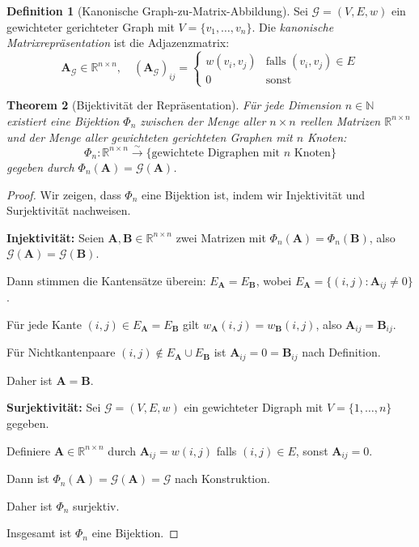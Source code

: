 \documentclass[12pt, a4paper]{article}
\newtheorem{theorem}{Theorem}[section]
\theoremstyle{definition}
\newtheorem{definition}[theorem]{Definition}
\theoremstyle{remark}
\newcommand{\R}{\mathbb{R}}
\newcommand{\N}{\mathbb{N}}
\newcommand{\vA}{\bm{A}}
\newcommand{\vB}{\bm{B}}
\newcommand{\Graph}{\mathcal{G}}
\begin{document}
\begin{definition}[Kanonische Graph-zu-Matrix-Abbildung]
\label{def:kanonische_graph_matrix}
Sei $\Graph = (V, E, w)$ ein gewichteter gerichteter Graph mit $V = \{v_1, \ldots, v_n\}$. Die \emph{kanonische Matrixrepräsentation} ist die Adjazenzmatrix:
\[
  \vA_{\Graph} \in \R^{n \times n}, \quad (\vA_{\Graph})_{ij} = \begin{cases}
    w(v_i, v_j) & \text{falls } (v_i, v_j) \in E \\
    0 & \text{sonst}
  \end{cases}
\]
\end{definition}

\begin{theorem}[Bijektivität der Repräsentation]
\label{thm:bijektivitaet}
Für jede Dimension $n \in \N$ existiert eine Bijektion $\Phi_n$ zwischen der Menge aller $n \times n$ reellen Matrizen $\R^{n \times n}$ und der Menge aller gewichteten gerichteten Graphen mit $n$ Knoten:
\[
  \Phi_n: \R^{n \times n} \xrightarrow{\sim} \{\text{gewichtete Digraphen mit } n \text{ Knoten}\}
\]
gegeben durch $\Phi_n(\vA) = \Graph(\vA)$.
\end{theorem}

\begin{proof}
Wir zeigen, dass $\Phi_n$ eine Bijektion ist, indem wir Injektivität und Surjektivität nachweisen.

\textbf{Injektivität:} Seien $\vA, \vB \in \R^{n \times n}$ zwei Matrizen mit $\Phi_n(\vA) = \Phi_n(\vB)$, also $\Graph(\vA) = \Graph(\vB)$.

Dann stimmen die Kantensätze überein: $E_{\vA} = E_{\vB}$, wobei $E_{\vA} = \{(i,j) : \vA_{ij} \neq 0\}$.

Für jede Kante $(i, j) \in E_{\vA} = E_{\vB}$ gilt $w_{\vA}(i,j) = w_{\vB}(i,j)$, also $\vA_{ij} = \vB_{ij}$.

Für Nichtkantenpaare $(i,j) \notin E_{\vA} \cup E_{\vB}$ ist $\vA_{ij} = 0 = \vB_{ij}$ nach Definition.

Daher ist $\vA = \vB$.

\textbf{Surjektivität:} Sei $\Graph = (V, E, w)$ ein gewichteter Digraph mit $V = \{1, \ldots, n\}$ gegeben.

Definiere $\vA \in \R^{n \times n}$ durch $\vA_{ij} = w(i,j)$ falls $(i,j) \in E$, sonst $\vA_{ij} = 0$.

Dann ist $\Phi_n(\vA) = \Graph(\vA) = \Graph$ nach Konstruktion.

Daher ist $\Phi_n$ surjektiv.

Insgesamt ist $\Phi_n$ eine Bijektion.
\end{proof}
\end{document}
